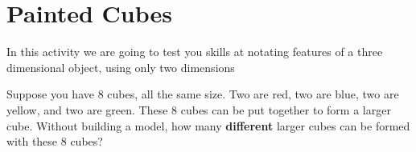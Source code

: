\newpage
\section{Painted Cubes}	

In this activity we are going to test you skills at notating features
of a three dimensional object, using only two dimensions


\begin{prob}
Suppose you have 8 cubes, all the same size. Two are red, two are
blue, two are yellow, and two are green. These 8 cubes can be put
together to form a larger cube. Without building a model, how
many \textbf{different} larger cubes can be formed with these 8 cubes?
\end{prob}
